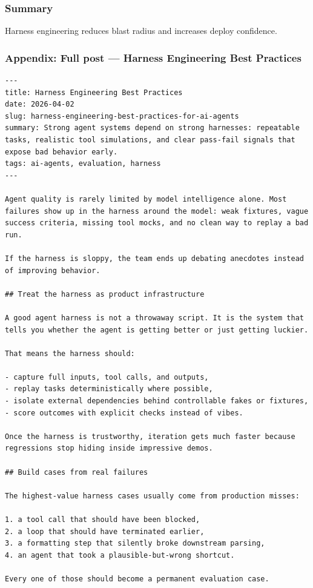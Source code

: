 \documentclass[aspectratio=169]{beamer}
\begin{document}
\begin{frame}
\frametitle{Summary}
Harness engineering reduces blast radius and increases deploy confidence.
\end{frame}


\begin{frame}[fragile]
\frametitle{Appendix: Full post — Harness Engineering Best Practices}
\begin{verbatim}
---
title: Harness Engineering Best Practices
date: 2026-04-02
slug: harness-engineering-best-practices-for-ai-agents
summary: Strong agent systems depend on strong harnesses: repeatable tasks, realistic tool simulations, and clear pass-fail signals that expose bad behavior early.
tags: ai-agents, evaluation, harness
---

Agent quality is rarely limited by model intelligence alone. Most failures show up in the harness around the model: weak fixtures, vague success criteria, missing tool mocks, and no clean way to replay a bad run.

If the harness is sloppy, the team ends up debating anecdotes instead of improving behavior.

## Treat the harness as product infrastructure

A good agent harness is not a throwaway script. It is the system that tells you whether the agent is getting better or just getting luckier.

That means the harness should:

- capture full inputs, tool calls, and outputs,
- replay tasks deterministically where possible,
- isolate external dependencies behind controllable fakes or fixtures,
- score outcomes with explicit checks instead of vibes.

Once the harness is trustworthy, iteration gets much faster because regressions stop hiding inside impressive demos.

## Build cases from real failures

The highest-value harness cases usually come from production misses:

1. a tool call that should have been blocked,
2. a loop that should have terminated earlier,
3. a formatting step that silently broke downstream parsing,
4. an agent that took a plausible-but-wrong shortcut.

Every one of those should become a permanent evaluation case.


\end{verbatim}
\end{frame}
\end{document}
